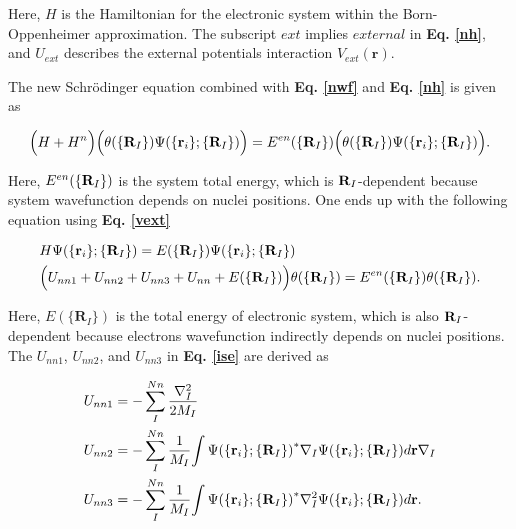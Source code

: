 \documentclass[a4paper, 12pt, titlepage,oneside,drop]{kthesis}
\begin{document}
Here, $H$ is the Hamiltonian for the electronic system within the Born-Oppenheimer approximation. The subscript $ext$ implies $external$ in \textbf{Eq. \ref{nh}}, and $U_{ext}$ describes
the external potentials interaction $V_{ext}({\textbf{r}})$. 

The new Schrödinger equation combined with \textbf{Eq. \ref{nwf}} and \textbf{Eq. \ref{nh}} is given as

\begin{equation}
 \Big( H+ {H}^n \Big) \Big({\theta(\{{\textbf R}_{I}\})} {\Psi(\{\textbf{r}_{i}\}; \{{\textbf R}_{I}\})} \Big) =
 E^{en}(\{{\textbf R_I}\}) \Big({\theta(\{{\textbf R}_{I}\})} {\Psi(\{\textbf{r}_{i}\}; \{{\textbf R}_{I}\})}\Big).
\end{equation}
 
\noindent Here, $E^{en}(\{{\textbf R }_I\})$ is the system total energy, which is ${\textbf R}_I$-dependent because system wavefunction depends on nuclei positions. One ends up with the following equation using \textbf{Eq. \ref{vext}}

\begin{equation}\begin{split}\label{ise}
& {H} {\Psi(\{\textbf{r}_{ i}\}; \{{\textbf R}_{ I}\})} = E{(\{\textbf{R}_{ I}\})} {\Psi(\{\textbf{r}_{i}\}; \{{\textbf R}_{I}\})} \\
& \Big( {U}_{nn1}+{U}_{nn2}+{U}_{nn3}+{U}_{nn}+E(\{{\textbf R}_{I}\}) \Big) {\theta(\{\textbf{R}_{I}\})} = E^{en}(\{{\textbf R}_I\}) {\theta(\{\textbf{R}_{I}\})}.
\end{split}
\end{equation}

\noindent Here, $E{(\{\textbf{R}_{I}\})}$ is the total energy of electronic system, which is also ${\textbf R}_I$-dependent because electrons wavefunction indirectly depends on nuclei positions. The ${U}_{nn1}$,
${U}_{nn2}$, and ${U}_{nn3}$ in \textbf{Eq. \ref{ise}} are derived as

\begin{equation}\begin{split}
 &  {U}_{nn1} = - \sum\limits_I^{{Nn}} \frac{{{\nabla}_{{I}}^{2}}}{2 M_{I}}   \\
 &  {U}_{nn2} = - \sum\limits_I^{{Nn}} \frac{1}{M_{I}} {\int {\Psi(\{\textbf{r}_{{i}}\}; \{\textbf{R}_{I}\})}^{\ast} {{\nabla}_{{I}}} {{\Psi(\{\textbf{r}_{{i}} \}; \{\textbf{R}_{I}\})}} d {\textbf r }} {{\nabla}_{{I}}}  \\
 &  {U}_{nn3} = - \sum\limits_I^{{Nn}} \frac{1}{M_{I}} {\int {{\Psi(\{\textbf{r}_{{i}}\}; \{\textbf{R}_{I}\})}}^{\ast} {{\nabla}_{{I}}^{2}} {{\Psi(\{\textbf{r}_{{i}} \}; \{\textbf{R}_{I}\})}} d {\textbf r }}. 
\end{split}\end{equation}
\end{document}
